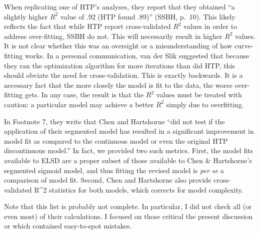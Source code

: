 \documentclass[
  english,
  doc,floatsintext]{apa6}
\begin{document}
\begin{appendix}
When replicating one of HTP's analyses, they report that they obtained
``a slightly higher \(R^2\) value of .92 (HTP found .89)'' (SSBH,
p.~10). This likely reflects the fact that while HTP report
cross-validated \(R^2\) values in order to address over-fitting, SSBH do
not. This will necessarily result in higher \(R^2\) values. It is not
clear whether this was an oversight or a misunderstanding of how
curve-fitting works. In a personal communication, van der Slik suggested
that because they ran the optimization algorithm for more iterations
than did HTP, this should obviate the need for cross-validation. This is
exactly backwards. It is a necessary fact that the more closely the
model is fit to the data, the worse over-fitting gets. In any case, the
result is that the \(R^2\) values must be treated with caution: a
particular model may achieve a better \(R^2\) simply due to overfitting.

In Footnote 7, they write that Chen and Hartshorne ``did not test if the
application of their segmented model has resulted in a significant
improvement in model fit as compared to the continuous model or even the
original HTP discontinuous model.'' In fact, we provided two such
metrics. First, the model fits available to ELSD are a proper subset of
those available to Chen \& Hartshorne's segmented sigmoid model, and
thus fitting the revised model is \emph{per se} a comparison of model
fit. Second, Chen and Hartshorne also provide cross-validated R\^{}2
statistics for both models, which corrects for model complexity.

Note that this list is probably not complete. In particular, I did not
check all (or even most) of their calculations. I focused on those
critical the present discussion or which contained easy-to-spot
mistakes.
\end{appendix}
\end{document}
